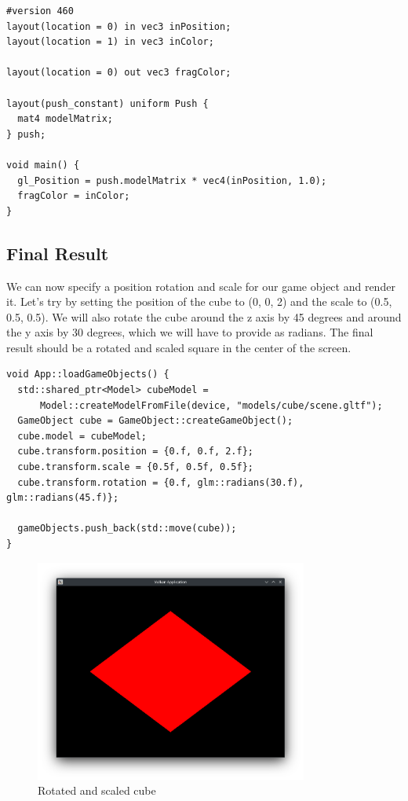 \documentclass[12pt]{report} \usepackage{preamble}
\begin{document}
\begin{lstlisting}[Language=C++]
#version 460
layout(location = 0) in vec3 inPosition;
layout(location = 1) in vec3 inColor;

layout(location = 0) out vec3 fragColor;

layout(push_constant) uniform Push {
  mat4 modelMatrix;
} push;

void main() {
  gl_Position = push.modelMatrix * vec4(inPosition, 1.0);
  fragColor = inColor;
}
\end{lstlisting}

\subsection{Final Result}

We can now specify a position rotation and scale for our game object and render it. Let's try by setting the position of the cube to (0, 0, 2) and the scale to (0.5, 0.5, 0.5).
We will also rotate the cube around the z axis by 45 degrees and around the y axis by 30 degrees, which we will have to provide as radians.
The final result should be a rotated and scaled square in the center of the screen.

\begin{lstlisting}[Language=C++]
void App::loadGameObjects() {
  std::shared_ptr<Model> cubeModel =
      Model::createModelFromFile(device, "models/cube/scene.gltf");
  GameObject cube = GameObject::createGameObject();
  cube.model = cubeModel;
  cube.transform.position = {0.f, 0.f, 2.f};
  cube.transform.scale = {0.5f, 0.5f, 0.5f};
  cube.transform.rotation = {0.f, glm::radians(30.f), glm::radians(45.f)};

  gameObjects.push_back(std::move(cube));
}
\end{lstlisting}

\begin{figure}[htbp]
	\centering
	\includegraphics[width=0.8\textwidth]{images/rotated_cube.png}
	\caption{Rotated and scaled cube}
\end{figure}
\end{document}
